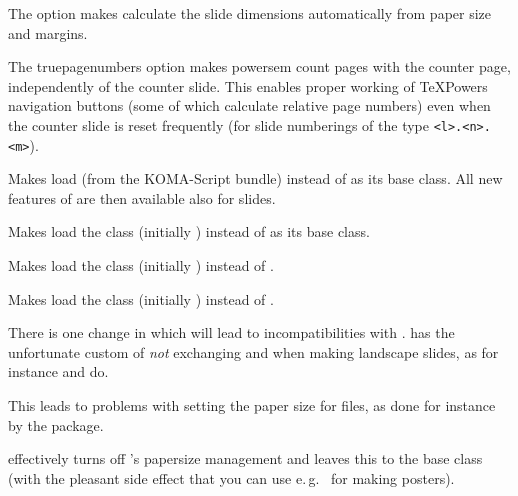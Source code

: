 \begin{slide}
\begin{description}
  The  option makes  calculate the slide dimensions automatically from paper size
  and margins.

\newslide

\item[\present{option: \code{truepagenumbers}}]
  The truepagenumbers option makes powersem count pages with the counter page, independently of the counter slide. This
  enables proper working of TeXPowers navigation buttons (some of which calculate relative page numbers) even when the
  counter slide is reset frequently (for slide numberings of the type \verb|<l>.<n>.<m>|).

\item[\present{option: \code{KOMA}}] Makes
   load  (from the KOMA-Script bundle) instead of
   as its base class. All new features of  are then available also for slides.

\item[\present{option: \code{UseBaseClass}}]
  Makes  load the class  (initially ) instead of
   as its base class.

\item[\present{option: \code{reportclass}}]
  Makes  load the class  (initially ) instead of
  .

\item[\present{option: \code{bookclass}}]
  Makes  load the class  (initially ) instead of
  .

\end{description}

There is one change in  which will lead to incompatibilities with .  has the
unfortunate custom of \emph{not} exchanging  and  when making landscape
slides, as for instance  and  do.

This leads to problems with setting the paper size for  files, as done for instance by the 
package.

 effectively turns off 's papersize management and leaves this to the base class (with the
pleasant side effect that you can use e.\,g.\  for making posters).


\end{slide}
